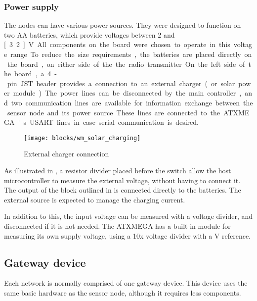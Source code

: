 \subsubsection{Power supply}
\label{sub2:hardware-powersupply}

The nodes can have various power sources. They were designed to function on two
AA batteries, which provide voltages between 2 and \unit[3.2]{V}. All components
on the board were chosen to operate in this voltage range.

To reduce the size requirements, the batteries are placed directly on the board,
on either side of the the radio transmitter. 

On the left side of the board, a 4-pin JST header provides a connection to an
external charger (or solar power module). The power lines can be disconnected by
the main controller, and two communication lines are available for information
exchange between the sensor node and its power source. These lines are connected
to the ATXMEGA's USART lines in case serial communication is desired.

\begin{figure}[h]
  \begin{center}
    \texttt{[image: blocks/wm\_solar\_charging]}
  \end{center}
  \caption{External charger connection}
  \label{fig:solar-charger}
\end{figure}

As illustrated in , a resistor divider placed before the
switch allow the host microcontroller to measure the external voltage, without
having to connect it. The output of the block outlined in
 is connected directly to the batteries. The external
source is expected to manage the charging current.

In addition to this, the input voltage can be measured with a voltage divider,
and disconnected if it is not needed. The ATXMEGA has a built-in module for
measuring its own supply voltage, using a 10x voltage divider with a \unit[1]{V}
reference.

\subsection{Gateway device}

Each network is normally comprised of one gateway device. This device uses the
same basic hardware as the sensor node, although it requires less components.


